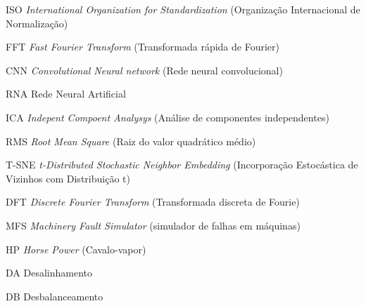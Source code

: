 \listoffigures*
\cleardoublepage
\begin{siglas}
\item[ISO] \textit{International Organization for Standardization} (Organização Internacional de Normalização)
\item[FFT] \textit{Fast Fourier Transform} (Transformada rápida de Fourier)
\item[CNN] \textit{Convolutional Neural network} (Rede neural convolucional)
\item[RNA] Rede Neural Artificial
\item[ICA] \textit{Indepent Compoent Analysys} (Análise de componentes independentes)
\item[RMS] \textit{Root Mean Square} (Raiz do valor quadrático médio)
\item[T-SNE] \textit{t-Distributed Stochastic Neighbor Embedding} (Incorporação
Estocástica de Vizinhos com Distribuição t)
\item[DFT] \textit{Discrete Fourier Transform} (Transformada discreta de Fourie)
\item[MFS] \textit{Machinery Fault Simulator} (simulador de falhas em máquinas)
\item[HP] \textit{Horse Power} (Cavalo-vapor)
\item[DA] Desalinhamento
\item[DB] Desbalanceamento

\end{siglas}
